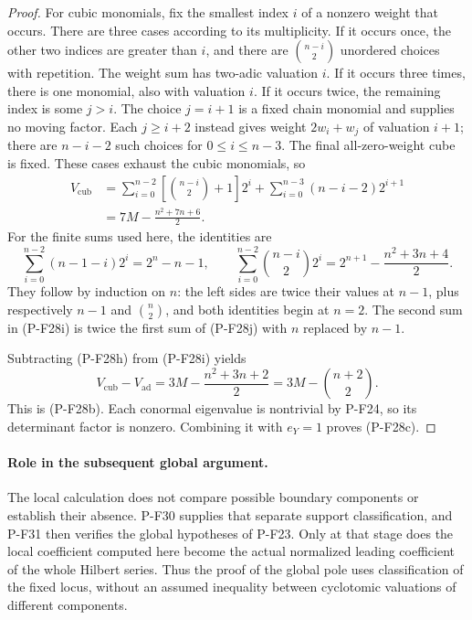 \documentclass[11pt,a4paper]{article}
\begin{document}
\begin{proof}
For cubic monomials, fix the smallest index $i$
of a nonzero weight that occurs. There are three
cases according to its multiplicity. If it occurs
once, the other two indices are greater than $i$,
and there are $\binom{n-i}{2}$ unordered choices
with repetition. The weight sum has two-adic
valuation $i$. If it occurs three times, there is
one monomial, also with valuation $i$.
If it occurs twice, the remaining index is some
$j>i$. The choice $j=i+1$ is a fixed chain
monomial and supplies no moving factor. Each
$j\ge i+2$ instead gives weight $2w_i+w_j$ of
valuation $i+1$; there are $n-i-2$ such choices
for $0\le i\le n-3$. The final all-zero-weight
cube is fixed. These cases exhaust the cubic
monomials, so
\begin{align*}
 V_{\mathrm{cub}}
 &=\sum_{i=0}^{n-2}
        \left[\binom{n-i}{2}+1\right]2^i
      +\sum_{i=0}^{n-3}(n-i-2)2^{i+1}\\
 &=7M-\frac{n^2+7n+6}{2}.
 \tag{P-F28i}
\end{align*}
For the finite sums used here, the identities are
\[
 \sum_{i=0}^{n-2}(n-1-i)2^i=2^n-n-1,\qquad
 \sum_{i=0}^{n-2}\binom{n-i}{2}2^i
    =2^{n+1}-\frac{n^2+3n+4}{2}.
 \tag{P-F28j}
\]
They follow by induction on $n$: the left sides
are twice their values at $n-1$, plus respectively
$n-1$ and $\binom n2$, and both identities begin
at $n=2$. The second sum in (P-F28i) is twice the
first sum of (P-F28j) with $n$ replaced by $n-1$.

Subtracting (P-F28h) from (P-F28i) yields
\[
 V_{\mathrm{cub}}-V_{\mathrm{ad}}
     =3M-\frac{n^2+3n+2}{2}
     =3M-\binom{n+2}{2}.
 \tag{P-F28k}
\]
This is (P-F28b). Each conormal eigenvalue is
nontrivial by P-F24, so its determinant factor
is nonzero. Combining it with $e_Y=1$ proves
(P-F28c).
\end{proof}

\paragraph{Role in the subsequent global argument.}
The local calculation does not compare possible boundary
components or establish their absence. P-F30 supplies
that separate support classification, and P-F31 then
verifies the global hypotheses of P-F23. Only at that
stage does the local coefficient computed here become
the actual normalized leading coefficient of the whole
Hilbert series. Thus the proof of the global pole uses
classification of the fixed locus, without an assumed
inequality between cyclotomic valuations of different
components.
\end{document}
